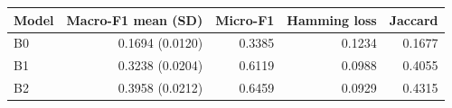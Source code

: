 \begin{tabular}{lrrrr}
\toprule
Model & Macro-F1 mean (SD) & Micro-F1 & Hamming loss & Jaccard \\
\midrule
B0 & 0.1694 (0.0120) & 0.3385 & 0.1234 & 0.1677 \\
B1 & 0.3238 (0.0204) & 0.6119 & 0.0988 & 0.4055 \\
B2 & 0.3958 (0.0212) & 0.6459 & 0.0929 & 0.4315 \\
\bottomrule
\end{tabular}
